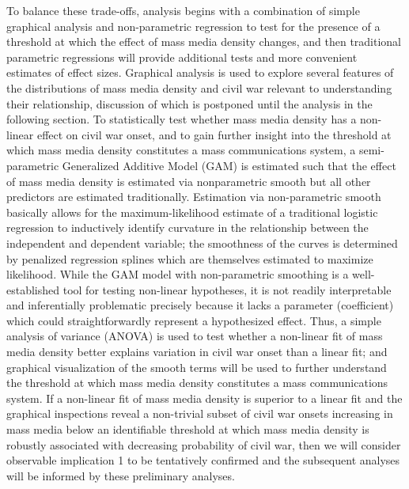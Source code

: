 \documentclass[11pt,article,oneside]{memoir}
\begin{document}
To balance these trade-offs, analysis begins with a combination of
simple graphical analysis and non-parametric regression to test for the
presence of a threshold at which the effect of mass media density
changes, and then traditional parametric regressions will provide
additional tests and more convenient estimates of effect sizes.
Graphical analysis is used to explore several features of the
distributions of mass media density and civil war relevant to
understanding their relationship, discussion of which is postponed until
the analysis in the following section. To statistically test whether
mass media density has a non-linear effect on civil war onset, and to
gain further insight into the threshold at which mass media density
constitutes a mass communications system, a semi-parametric Generalized
Additive Model (GAM) is estimated such that the effect of mass media
density is estimated via nonparametric smooth but all other predictors
are estimated traditionally. Estimation via non-parametric smooth
basically allows for the maximum-likelihood estimate of a traditional
logistic regression to inductively identify curvature in the
relationship between the independent and dependent variable; the
smoothness of the curves is determined by penalized regression splines
which are themselves estimated to maximize likelihood. While the GAM
model with non-parametric smoothing is a well-established tool for
testing non-linear hypotheses, it is not readily interpretable and
inferentially problematic precisely because it lacks a parameter
(coefficient) which could straightforwardly represent a hypothesized
effect. Thus, a simple analysis of variance (ANOVA) is used to test
whether a non-linear fit of mass media density better explains variation
in civil war onset than a linear fit; and graphical visualization of the
smooth terms will be used to further understand the threshold at which
mass media density constitutes a mass communications system. If a
non-linear fit of mass media density is superior to a linear fit and the
graphical inspections reveal a non-trivial subset of civil war onsets
increasing in mass media below an identifiable threshold at which mass
media density is robustly associated with decreasing probability of
civil war, then we will consider observable implication 1 to be
tentatively confirmed and the subsequent analyses will be informed by
these preliminary analyses.
\end{document}
